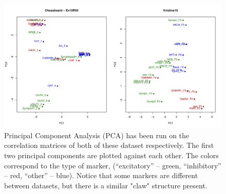 \documentclass[simplex.tex]{subfiles}
\begin{document}
\begin{figure}[h!]
\begin{cframed}
\centering
\includegraphics[width=\textwidth]{../../figs/2dProjClaw.pdf}
\caption{
  Principal Component Analysis (PCA) has been run on the correlation
  matrices of both of these dataset respectively.  The first two
  principal components are plotted against each other.  The colors
  correspond to the type of marker, (``excitatory'' -- green,
  ``inhibitory'' -- red, ``other'' -- blue).  Notice that some markers are
  different between datasets, but there is a similar "claw" structure
  present. 
}
\label{fig:synClaw}
\end{cframed}
\end{figure}
\end{document}
